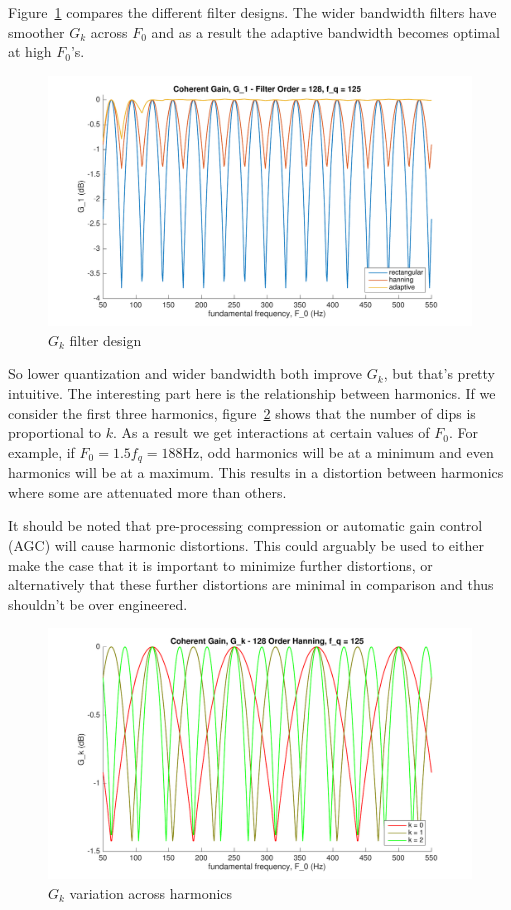 \documentclass [11pt, proquest] {uwthesis}[2015/03/03]
\begin{document}
Figure~\ref{fig:g_k_3} compares the different filter designs.  The wider bandwidth filters have smoother $G_k$ across $F_0$ and as a result the adaptive bandwidth becomes optimal at high $F_0$'s.

\begin{figure}[!ht]
  \centering
    \includegraphics[width=1\textwidth]{g_k_3}   
    \caption{$G_k$ filter design}\label{fig:g_k_3}
\end{figure}

So lower quantization and wider bandwidth both improve $G_k$, but that's pretty intuitive.  The interesting part here is the relationship between harmonics.  If we consider the first three harmonics, figure~\ref{fig:g_k_4} shows that the number of dips is proportional to $k$.  As a result we get interactions at certain values of $F_0$.  For example, if $F_0 = 1.5f_q = 188$Hz, odd harmonics will be at a minimum and even harmonics will be at a maximum.  This results in a distortion between harmonics where some are attenuated more than others.

It should be noted that pre-processing compression or automatic gain control (AGC) will cause harmonic distortions.  This could arguably be used to either make the case that it is important to minimize further distortions, or alternatively that these further distortions are minimal in comparison and thus shouldn't be over engineered.

\begin{figure}[!ht]
  \centering
    \includegraphics[width=1\textwidth]{g_k_4}   
    \caption{$G_k$ variation across harmonics}\label{fig:g_k_4}
\end{figure}
\end{document}
